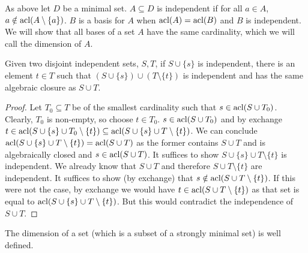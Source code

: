 \begin{definition}\label{definition_independence}
As above let \(D\) be a minimal set. \(A \subseteq D\) is independent if for all \(a \in A\), \(a \notin \text{acl}(A \setminus \{a\})\). 
\(B\) is a basis for \(A\) when \(\text{acl}(A) = \text{acl}(B)\) and \(B\) is independent.
We will show that all bases of a set \(A\)  have the same cardinality, which we will call the dimension of \(A\).
\end{definition}

\begin{lemma}\label{lemma_dimension}
Given two disjoint independent sets, \(S, T\), 
 if \(S \cup \{s\}\) is independent, there is an element \(t \in T\) such that \((S \cup \{s\}) \cup (T \setminus \{t\})\) is independent and has the same algebraic closure as \(S \cup T\). 
\end{lemma}

\begin{proof}
Let \(T_0 \subseteq T\) be of the smallest cardinality such that \(s \in \text{acl}(S \cup T_0)\). 
Clearly, \(T_0\) is non-empty, so choose \(t \in T_0\). 
\(s \in \text{acl}(S \cup T_0)\) and by exchange \(t \in \text{acl}(S \cup \{s\} \cup T_0 \setminus \{t\}) \subseteq \text{acl}(S \cup \{s\} \cup T \setminus \{t\})\).
We can conclude \(\text{acl}(S \cup \{s\} \cup T \setminus \{t\}) = \text{acl}(S \cup T)\) as the former contains \(S \cup T\) and is algebraically closed and \(s \in \text{acl}(S \cup T)\). 
It suffices to show \(S \cup \{s\} \cup T \setminus \{t\}\) is independent. 
We already know that \(S \cup T\) and therefore \(S \cup T \setminus \{t\}\) are independent. 
It suffices to show (by exchange) that \(s \notin \text{acl}(S \cup T \setminus \{t\})\).
If this were not the case, by exchange we would have \(t \in \text{acl}(S \cup T \setminus \{t\})\) as that set is equal to \(\text{acl}(S \cup \{s\} \cup T \setminus\{t\})\).
But this would contradict the independence of \(S \cup T\). 
\end{proof}

\begin{theorem}\label{theorem_dimension}
The dimension of a set (which is a subset of a strongly minimal set) is well defined.
\end{theorem}

